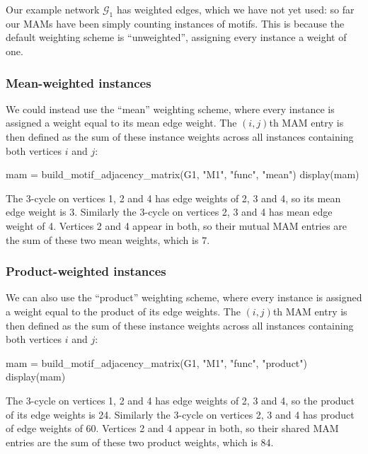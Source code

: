 \documentclass{article}
\begin{document}
Our example network $\mathcal{G}_1$ has weighted edges,
which we have not yet used:
so far our MAMs have been simply counting
instances of motifs.
This is because the default weighting scheme is
``unweighted'', assigning every instance a weight of one.

\subsubsection{Mean-weighted instances}

We could instead use the ``mean'' weighting scheme,
where every instance is assigned a weight equal to its
mean edge weight.
The $(i,j)$th MAM entry is then defined as the sum of these
instance weights across all instances containing
both vertices $i$ and $j$:

\begin{tcolorbox}[colback=black!5!white,colframe=black!15!white]
\begin{juliablock}
mam = build_motif_adjacency_matrix(G1, "M1", "func", "mean")
display(mam)
\end{juliablock}
\texttt{\obeylines\printpythontex}
\end{tcolorbox}

The 3-cycle on vertices 1, 2 and 4
has edge weights of 2, 3 and 4, so its mean edge weight is 3.
Similarly the 3-cycle on vertices 2, 3 and 4 has mean edge weight of 4.
Vertices 2 and 4 appear in both, so their mutual MAM entries are the
sum of these two mean weights, which is 7.

\subsubsection{Product-weighted instances}

We can also use the ``product'' weighting scheme,
where every instance is assigned a weight equal to the
product of its edge weights.
The $(i,j)$th MAM entry is then defined as the sum of these
instance weights across all instances containing
both vertices $i$ and $j$:

\begin{tcolorbox}[colback=black!5!white,colframe=black!15!white]
\begin{juliablock}
mam = build_motif_adjacency_matrix(G1, "M1", "func", "product")
display(mam)
\end{juliablock}
\texttt{\obeylines\printpythontex}
\end{tcolorbox}

The 3-cycle on vertices 1, 2 and 4
has edge weights of 2, 3 and 4, so the product of its edge weights is 24.
Similarly the 3-cycle on vertices 2, 3 and 4 has product of edge weights of 60.
Vertices 2 and 4 appear in both, so their shared MAM entries are the
sum of these two product weights, which is 84.
\end{document}
